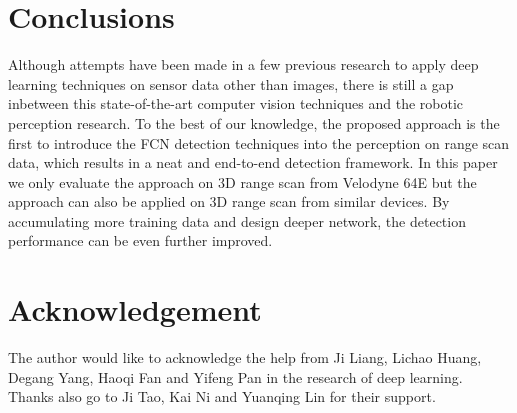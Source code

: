 \documentclass[conference]{IEEEtran}
\begin{document}
\section{Conclusions}
Although attempts have been made in a few previous research to apply deep learning techniques on sensor data other than images, there is still a gap inbetween this state-of-the-art computer vision techniques and the robotic perception research. To the best of our knowledge, the proposed approach is the first to introduce the FCN detection techniques into the perception on range scan data, which results in a neat and end-to-end detection framework. In this paper we only evaluate the approach on 3D range scan from Velodyne 64E but the approach can also be applied on 3D range scan from similar devices. By accumulating more training data and design deeper network, the detection performance can be even further improved. 

\section{Acknowledgement}
The author would like to acknowledge the help from Ji Liang, Lichao Huang, Degang Yang, Haoqi Fan and Yifeng Pan in the research of deep learning. Thanks also go to Ji Tao, Kai Ni and Yuanqing Lin for their support.



\end{document}
